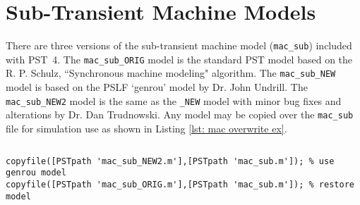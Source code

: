 \section{Sub-Transient Machine Models}  
There are three versions of the sub-transient machine model (\verb|mac_sub|) included with \mbox{PST 4}.
The \verb|mac_sub_ORIG| model is the standard PST model based on the R. P. Schulz, ``Synchronous machine modeling" algorithm.
The \verb|mac_sub_NEW| model is based on the PSLF `genrou' model by Dr. John Undrill.
The \verb|mac_sub_NEW2| model is the same as the \verb|_NEW| model with minor bug fixes and alterations by Dr. Dan Trudnowski.
Any model may be copied over the \verb|mac_sub| file for simulation use as shown in Listing \ref{lst: mac overwrite ex}.

\begin{lstlisting}[caption={mac\_sub Overwrite Example},label={lst: mac overwrite ex}]
\end{lstlisting}\vspace{-2 em}
\begin{verbatim}
copyfile([PSTpath 'mac_sub_NEW2.m'],[PSTpath 'mac_sub.m']); % use genrou model
copyfile([PSTpath 'mac_sub_ORIG.m'],[PSTpath 'mac_sub.m']); % restore model
\end{verbatim} 
